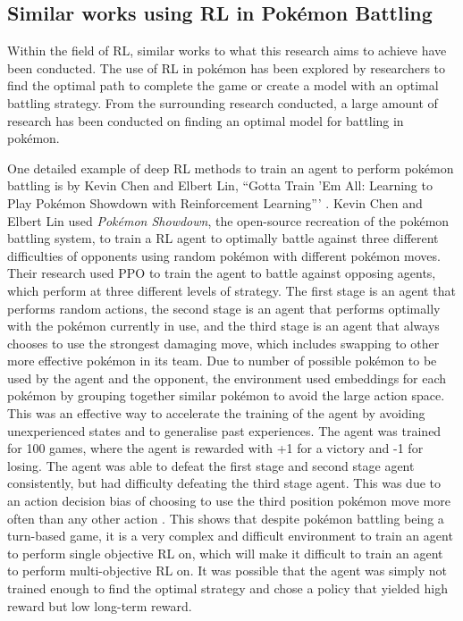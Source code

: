 \subsection{Similar works using RL in Pokémon Battling}

Within the field of RL, similar works to what this research aims to achieve have been conducted. The use of RL in pokémon has been explored by researchers to find the optimal path to complete the game or create a model with an optimal battling strategy. From the surrounding research conducted, a large amount of research has been conducted on finding an optimal model for battling in pokémon. 

One detailed example of deep RL methods to train an agent to perform pokémon battling is by Kevin Chen and Elbert Lin, ``Gotta Train 'Em All: Learning to Play Pokémon Showdown with Reinforcement Learning''' \cite{chen2018gotta}. Kevin Chen and Elbert Lin used \textit{Pokémon Showdown}, the open-source recreation of the pokémon battling system, to train a RL agent to optimally battle against three different difficulties of opponents using random pokémon with different pokémon moves. Their research used PPO to train the agent to battle against opposing agents, which perform at three different levels of strategy. The first stage is an agent that performs random actions, the second stage is an agent that performs optimally with the pokémon currently in use, and the third stage is an agent that always chooses to use the strongest damaging move, which includes swapping to other more effective pokémon in its team. Due to number of possible pokémon to be used by the agent and the opponent, the environment used embeddings for each pokémon by grouping together similar pokémon to avoid the large action space. This was an effective way to accelerate the training of the agent by avoiding unexperienced states and to generalise past experiences. The agent was trained for 100 games, where the agent is rewarded with +1 for a victory and -1 for losing. The agent was able to defeat the first stage and second stage agent consistently, but had difficulty defeating the third stage agent. This was due to an action decision bias of choosing to use the third position pokémon move more often than any other action \cite{chen2018gotta}. This shows that despite pokémon battling being a turn-based game, it is a very complex and difficult environment to train an agent to perform single objective RL on, which will make it difficult to train an agent to perform multi-objective RL on. It was possible that the agent was simply not trained enough to find the optimal strategy and chose a policy that yielded high reward but low long-term reward. 

